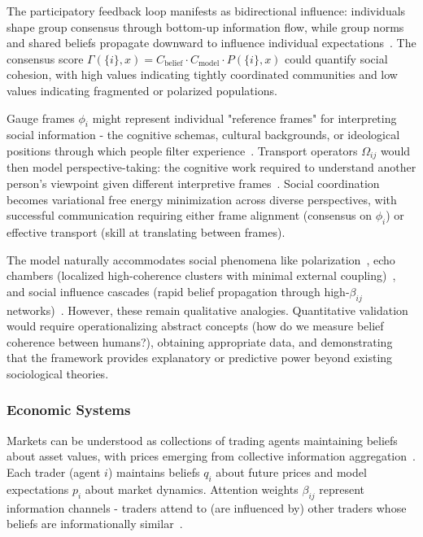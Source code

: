 \documentclass[11pt]{article}
\begin{document}
The participatory feedback loop manifests as bidirectional influence: individuals shape group consensus through bottom-up information flow, while group norms and shared beliefs propagate downward to influence individual expectations~\cite{Giddens1984}. The consensus score $\Gamma(\{i\}, x) = C_{\text{belief}} \cdot C_{\text{model}} \cdot P(\{i\}, x)$ could quantify social cohesion, with high values indicating tightly coordinated communities and low values indicating fragmented or polarized populations.

Gauge frames $\phi_i$ might represent individual "reference frames" for interpreting social information - the cognitive schemas, cultural backgrounds, or ideological positions through which people filter experience~\cite{Goffman1974}. Transport operators $\Omega_{ij}$ would then model perspective-taking: the cognitive work required to understand another person's viewpoint given different interpretive frames~\cite{Mead1934}. Social coordination becomes variational free energy minimization across diverse perspectives, with successful communication requiring either frame alignment (consensus on $\phi_i$) or effective transport (skill at translating between frames).

The model naturally accommodates social phenomena like polarization~\cite{Sunstein2009,Bail2021}, echo chambers (localized high-coherence clusters with minimal external coupling)~\cite{Pariser2011}, and social influence cascades (rapid belief propagation through high-$\beta_{ij}$ networks)~\cite{Watts2007}. However, these remain qualitative analogies. Quantitative validation would require operationalizing abstract concepts (how do we measure belief coherence between humans?), obtaining appropriate data, and demonstrating that the framework provides explanatory or predictive power beyond existing sociological theories.

\subsubsection{Economic Systems}

Markets can be understood as collections of trading agents maintaining beliefs about asset values, with prices emerging from collective information aggregation~\cite{Hayek1945,Grossman1980}. Each trader (agent $i$) maintains beliefs $q_i$ about future prices and model expectations $p_i$ about market dynamics. Attention weights $\beta_{ij}$ represent information channels - traders attend to (are influenced by) other traders whose beliefs are informationally similar~\cite{Shiller2015}.
\end{document}

